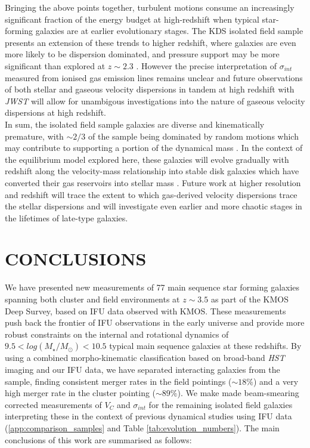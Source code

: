 \documentclass[fleqn,usenatbib]{mn2e}
\begin{document}
Bringing the above points together, turbulent motions consume an increasingly significant fraction of the energy budget at high-redshift when typical star-forming galaxies are at earlier evolutionary stages.
The KDS isolated field sample presents an extension of these trends to higher redshift, where galaxies are even more likely to be dispersion dominated, and pressure support may be more significant than explored at $z\sim2.3$ \citep{Wuyts2016b,Ubler2017,Genzel2017,Lang2017}.    
However the precise interpretation of $\sigma_{int}$ measured from ionised gas emission lines remains unclear and future observations of both stellar and gaseous velocity dispersions in tandem at high redshift with {\it JWST} will allow for unambigous investigations into the nature of gaseous velocity dispersions at high redshift. \\

In sum, the isolated field sample galaxies are diverse and kinematically premature, with $\sim2/3$ of the sample being dominated by random motions which may contribute to supporting a portion of the dynamical mass \citep[e.g.][]{Kassin2007,Burkert2010,Kassin2012,Newman2013,Straatman2017,Ubler2017,Lang2017}.
In the context of the equilibrium model explored here, these galaxies will evolve gradually with redshift along the velocity-mass relationship into stable disk galaxies which have converted their gas reservoirs into stellar mass \citep[e.g.][]{Lilly2013,Tacconi2013,Wisnioski2015,Tacconi2017}. 
Future work at higher resolution and redshift will trace the extent to which gas-derived velocity dispersions trace the stellar dispersions and will investigate even earlier and more chaotic stages in the lifetimes of late-type galaxies.

\section{CONCLUSIONS}\label{sec:conclusion}
We have presented new measurements of 77 main sequence star forming galaxies spanning both cluster and field environments at $z\sim3.5$ as part of the KMOS Deep Survey, based on IFU data observed with KMOS.
These measurements push back the frontier of IFU observations in the early universe and provide more robust constraints on the internal and rotational dynamics of $9.5 < log(M_{\star}/M_{\odot})< 10.5$ typical main sequence galaxies at these redshifts.
By using a combined morpho-kinematic classification based on broad-band {\em HST} imaging and our IFU data, we have separated interacting galaxies from the sample, finding consistent merger rates in the field pointings ($\sim18\%$) and a very high merger rate in the cluster pointing ($\sim89\%$).
We make made beam-smearing corrected measurements of $V_{C}$ and $\sigma_{int}$ for the remaining isolated field galaxies interpreting these in the context of previous dynamical studies using IFU data (\cref{app:comparison_samples} and Table \ref{tab:evolution_numbers}).
The main conclusions of this work are summarised as follows:
\end{document}
